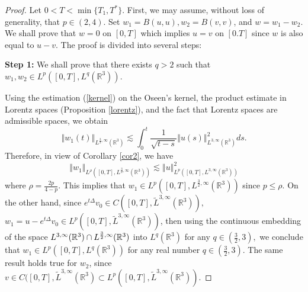 \documentclass[11pt]{amsart}%
\theoremstyle{plain}
\numberwithin{equation}{section}
\begin{document}
\begin{proof}
Let $0<T<\min{\{T_1,T^\ast\}}.$ First, we may assume, without loss of generality, that
$p\in(2,4)$. Set $w_{1}=B(u,u),w_{2}=B(v,v)$, and $w=w_{1}-w_{2}.$ We shall
prove that $w=0$ on $[0,T]$ which implies $u=v$ on $[0.T]$ since $w$ is also equal to   $u-v$. The proof is divided  into several steps:
\par\noindent\textbf{Step 1:} We shall prove that there exists $q>2$
such that $w_{1},w_{2}\in L^{p}([0,T],L^{q}(\mathbb {R}^{3})).$
\par\noindent Using the estimation (\ref{kernel}) on the Oseen's kernel, the product estimate in Lorentz spaces (Proposition \ref{lorentz}), and the fact that Lorentz spaces are admissible spaces,  we obtain
\[
\left\Vert w_{1}(t)\right\Vert _{L^{\frac{3}{2},\infty }(\mathbb{R}%
^{3})}\lesssim \int_{0}^{t}\frac{1}{\sqrt{t-s}}\left\Vert u(s)\right\Vert
_{L^{3,\infty }(\mathbb{R}^{3})}^{2}ds.
\]%
Therefore, in view of  Corollary \ref{cor2}, we have
\[
\left\Vert w_{1}\right\Vert _{L^{\rho }([0,T],L^{\frac{3}{2},\infty }(%
\mathbb{R}^{3}))}\lesssim \left\Vert u\right\Vert _{L^{p}([0,T],L^{3,\infty
}(\mathbb{R}^{3}))}^{2}
\]%
where $\rho =\frac{2p}{4-p}.$ This implies that $w_1\in L^{p }([0,T],L^{\frac{3}{2},\infty }( \mathbb{R}^{3}))$ since $p\leq \rho$. On the other hand, since $%
e^{t\Delta }v_{0}\in C([0,T],\tilde{L}^{3,\infty }(\mathbb{R}^{3})),$ $%
w_{1}=u-e^{t\Delta }v_{0}\in L^{p}([0,T],\tilde{L}^{3,\infty }(\mathbb{R}%
^{3}))$, then using the continuous embedding of the space  $L^{3,\infty }(\mathbb{R}^{3})\cap L^{%
\frac{3}{2},\infty }(\mathbb{R}^{3})$ into $
L^{q}(\mathbb{R}^{3})$ for any $q\in (\frac{3}{2},3),$  we conclude that $%
w_{1}\in L^{p}([0,T],L^{q}(\mathbb{R}^{3}))$ for any real number $q\in (\frac{3}{2},3).$ The same result
holds true for $w_{2}$, since $v\in C([0,T],\tilde{L}^{3,\infty }(\mathbb{R}%
^{3})\subset L^{p}([0,T],\tilde{L}^{3,\infty }(\mathbb{R}^{3})).$


\end{proof}
\end{document}
